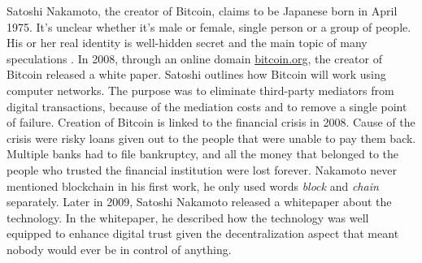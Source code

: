 Satoshi Nakamoto, the creator of Bitcoin, claims to be Japanese born in April 1975. It’s unclear whether it’s male or female, single person or a group of people. His or her real identity is well-hidden secret and the main topic of many speculations \cite{satoshi}. 
In 2008, through an online domain \url{bitcoin.org}, the creator of Bitcoin released a white paper. Satoshi outlines how Bitcoin will work using computer networks. The purpose was to eliminate third-party mediators from digital transactions, because of the mediation costs and to remove a single point of failure. Creation of Bitcoin is linked to the financial crisis in 2008. Cause of the crisis were risky loans given out to the people that were unable to pay them back. Multiple banks had to file bankruptcy, and all the money that belonged to the people who trusted the financial institution were lost forever.  
Nakamoto never mentioned blockchain in his first work, he only used words \emph{block} and \emph{chain} separately. Later in 2009, Satoshi Nakamoto released a whitepaper about the technology. In the whitepaper, he described how the technology was well equipped to enhance digital trust given the decentralization aspect that meant nobody would ever be in control of anything. 